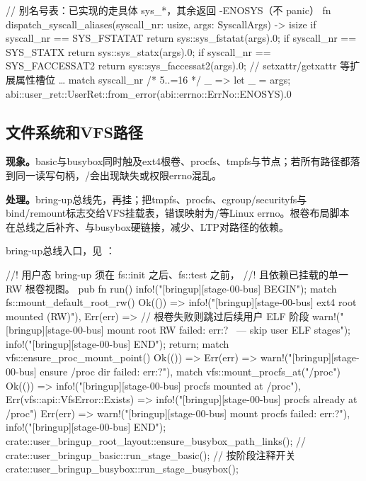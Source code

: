 \begin{rustcode}
// 别名号表：已实现的走具体 sys_*，其余返回 -ENOSYS（不 panic）
fn dispatch_syscall_aliases(syscall_nr: usize, args: SyscallArgs) -> isize {
    if syscall_nr == SYS_FSTATAT {
        return sys::sys_fstatat(args).0;
    }
    if syscall_nr == SYS_STATX {
        return sys::sys_statx(args).0;
    }
    if syscall_nr == SYS_FACCESSAT2 {
        return sys::sys_faccessat2(args).0;
    }
    // setxattr/getxattr 等扩展属性槽位 …
    match syscall_nr { /* 5..=16 */ _ => {} }
    let _ = args;
    abi::user_ret::UserRet::from_error(abi::errno::ErrNo::ENOSYS).0
}
\end{rustcode}

\subsection{文件系统和VFS路径}

\textbf{现象。}basic与busybox同时触及ext4根卷、procfs、tmpfs与节点；若所有路径都落到同一读写句柄，/会出现缺失或权限errno混乱。

\textbf{处理。}bring-up总线先，再挂；把tmpfs、procfs、cgroup/securityfs与bind/remount标志交给VFS挂载表，错误映射为/等Linux errno。根卷布局脚本  在总线之后补齐、与busybox硬链接，减少、LTP对路径的依赖。

bring-up总线入口，见 ：

\begin{rustcode}
//! 用户态 bring-up 须在 fs::init 之后、fs::test 之前，
//! 且依赖已挂载的单一 RW 根卷视图。
pub fn run() {
    info!("[bringup][stage-00-bus] BEGIN");
    match fs::mount_default_root_rw() {
        Ok(()) => info!("[bringup][stage-00-bus] ext4 root mounted (RW)"),
        Err(err) => {
            // 根卷失败则跳过后续用户 ELF 阶段
            warn!("[bringup][stage-00-bus] mount root RW failed: {err:?} \
                   — skip user ELF stages");
            info!("[bringup][stage-00-bus] END");
            return;
        }
    }
    match vfs::ensure_proc_mount_point() {
        Ok(()) => {}
        Err(err) => warn!("[bringup][stage-00-bus] ensure /proc dir failed: {err:?}"),
    }
    match vfs::mount_procfs_at("/proc") {
        Ok(()) => info!("[bringup][stage-00-bus] procfs mounted at /proc"),
        Err(vfs::api::VfsError::Exists) => {
            info!("[bringup][stage-00-bus] procfs already at /proc")
        }
        Err(err) => warn!("[bringup][stage-00-bus] mount procfs failed: {err:?}"),
    }
    info!("[bringup][stage-00-bus] END");
    crate::user_bringup_root_layout::ensure_busybox_path_links();
    // crate::user_bringup_basic::run_stage_basic();  // 按阶段注释开关
    crate::user_bringup_busybox::run_stage_busybox();
}
\end{rustcode}

